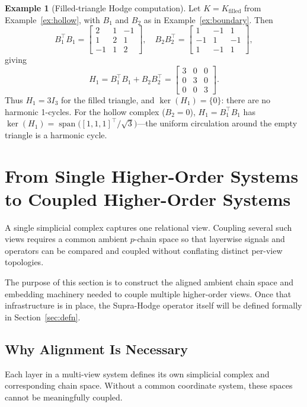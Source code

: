 \documentclass[11pt]{article}
\theoremstyle{definition}
\newtheorem{example}[theorem]{Example}
\theoremstyle{remark}
\DeclareMathOperator{\spn}{span}
\begin{document}
\begin{example}[Filled-triangle Hodge computation]
\label{ex:hodge}
Let $K=K_{\mathrm{filled}}$ from Example~\ref{ex:hollow}, with
$B_1$ and $B_2$ as in Example~\ref{ex:boundary}. Then
\[
  B_1^\top B_1 = \begin{bmatrix}2&1&-1\\1&2&1\\-1&1&2\end{bmatrix},\quad
  B_2 B_2^\top = \begin{bmatrix}1&-1&1\\-1&1&-1\\1&-1&1\end{bmatrix},
\]
giving
\[
  H_1 = B_1^\top B_1 + B_2B_2^\top
      = \begin{bmatrix}3&0&0\\0&3&0\\0&0&3\end{bmatrix}.
\]
Thus $H_1=3I_3$ for the filled triangle, and $\ker(H_1)=\{0\}$: there are no
harmonic 1-cycles. For the hollow complex ($B_2=0$), $H_1=B_1^\top B_1$ has
$\ker(H_1) = \spn\bigl([1,1,1]^\top/\sqrt{3}\bigr)$---the uniform circulation
around the empty triangle is a harmonic cycle.
\end{example}


\section{From Single Higher-Order Systems to Coupled Higher-Order Systems}
\label{sec:coupling}

A single simplicial complex captures one relational view. Coupling several such
views requires a common ambient $p$-chain space so that layerwise signals and
operators can be compared and coupled without conflating distinct per-view
topologies.

The purpose of this section is to construct the aligned ambient chain space and
embedding machinery needed to couple multiple higher-order views. Once that
infrastructure is in place, the Supra-Hodge operator itself will be defined
formally in Section~\ref{sec:defn}.

\subsection{Why Alignment Is Necessary}

Each layer in a multi-view system defines its own simplicial complex and corresponding chain space. Without a common coordinate system, these spaces cannot be meaningfully coupled.
\end{document}

